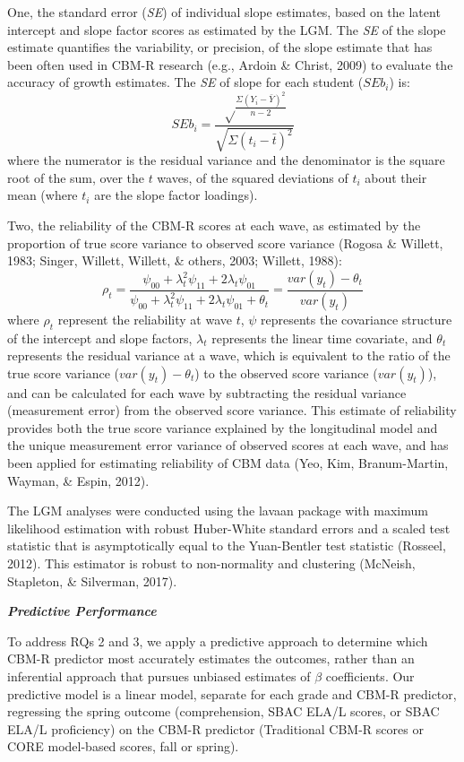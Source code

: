 \documentclass[
  english,
  man, fleqn, noextraspace]{apa6}
\begin{document}
One, the standard error (\emph{SE}) of individual slope estimates, based on the latent intercept and slope factor scores as estimated by the LGM. The \emph{SE} of the slope estimate quantifies the variability, or precision, of the slope estimate that has been often used in CBM-R research (e.g., Ardoin \& Christ, 2009) to evaluate the accuracy of growth estimates. The \emph{SE} of slope for each student (\(SEb_i\)) is:
\[
SEb_i = \frac{\sqrt\frac{\Sigma(Y_i - \bar{Y})^2}{n - 2}}{\sqrt{\Sigma(t_i - \bar{t})^2}}
\]
where the numerator is the residual variance and the denominator is the square root of the sum, over the \(t\) waves, of the squared deviations of \(t_i\) about their mean (where \(t_i\) are the slope factor loadings).

Two, the reliability of the CBM-R scores at each wave, as estimated by the proportion of true score variance to observed score variance (Rogosa \& Willett, 1983; Singer, Willett, Willett, \& others, 2003; Willett, 1988):
\[
\rho_t = \frac{\psi_{00} + \lambda^2_t \psi_{11} + 2\lambda_t \psi_{01}}{\psi_{00} + \lambda^2_t \psi_{11} + 2\lambda_t \psi_{01} + \theta_t} = \frac{var(y_t) - \theta_t}{var(y_t)}
\]
where \(\rho_t\) represent the reliability at wave \(t\), \(\psi\) represents the covariance structure of the intercept and slope factors, \(\lambda_t\) represents the linear time covariate, and \(\theta_t\) represents the residual variance at a wave, which is equivalent to the ratio of the true score variance (\(var(y_t) - \theta_t\)) to the observed score variance (\(var(y_t)\)), and can be calculated for each wave by subtracting the residual variance (measurement error) from the observed score variance. This estimate of reliability provides both the true score variance explained by the longitudinal model and the unique measurement error variance of observed scores at each wave, and has been applied for estimating reliability of CBM data (Yeo, Kim, Branum-Martin, Wayman, \& Espin, 2012).

The LGM analyses were conducted using the lavaan package with maximum likelihood estimation with robust Huber-White standard errors and a scaled test statistic that is asymptotically equal to the Yuan-Bentler test statistic (Rosseel, 2012). This estimator is robust to non-normality and clustering (McNeish, Stapleton, \& Silverman, 2017).

\textbf{\emph{Predictive Performance}}

To address RQs 2 and 3, we apply a predictive approach to determine which CBM-R predictor most accurately estimates the outcomes, rather than an inferential approach that pursues unbiased estimates of \(\beta\) coefficients. Our predictive model is a linear model, separate for each grade and CBM-R predictor, regressing the spring outcome (comprehension, SBAC ELA/L scores, or SBAC ELA/L proficiency) on the CBM-R predictor (Traditional CBM-R scores or CORE model-based scores, fall or spring).
\end{document}
